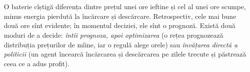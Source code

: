 \section{}
\begin{intuition}
%
{O baterie cîștigă diferența dintre prețul unei ore ieftine și cel al unei ore scumpe, minus energia pierdută la încărcare și descărcare. Retrospectiv, cele mai bune două ore sînt evidente; în momentul deciziei, ele sînt o prognoză.
Există două moduri de a decide: \emph{întîi prognoza, apoi optimizarea} (o rețea prognozează distribuția prețurilor de mîine, iar o regulă alege orele) sau \emph{învățarea directă a politicii} (un agent încearcă încărcarea și descărcarea pe zilele trecute și păstrează ceea ce a adus profit).}
\end{intuition}
